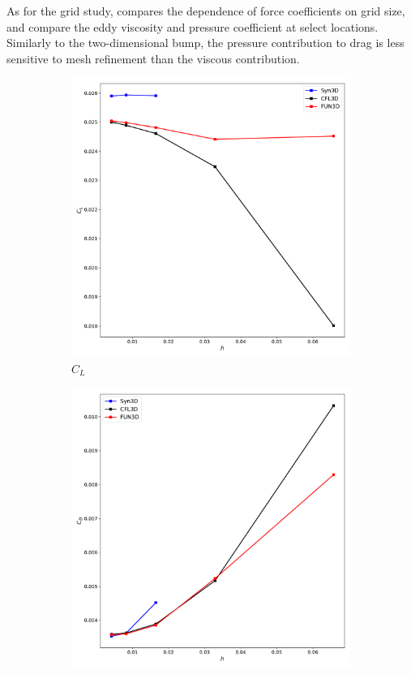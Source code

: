 As for the grid study,  compares the dependence of force coefficients on grid size,  and  compare the eddy viscosity and pressure coefficient at select locations. Similarly to the two-dimensional bump, the pressure contribution to drag is less sensitive to mesh refinement than the viscous contribution.
\begin{figure}[ht!]
\centering
\begin{subfigure}{.45\textwidth}
  \centering
  \includegraphics[width=1.0\textwidth]{figs/3dbump/C_L_GridStudy.pdf}
  \caption{$C_L$}
\end{subfigure}%
\begin{subfigure}{.45\textwidth}
  \centering
  \includegraphics[width=1.0\textwidth]{figs/3dbump/C_D_GridStudy.pdf}

\end{subfigure}
\end{figure}
